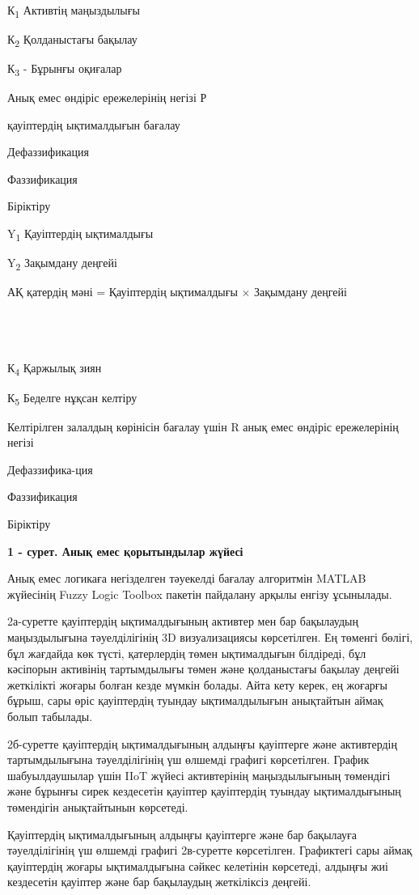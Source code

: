 \documentclass[
]{article}
\begin{document}
~

К\textsubscript{1} Активтің маңыздылығы

К\textsubscript{2} Қолданыстағы бақылау

К\textsubscript{3} - Бұрынғы оқиғалар

Анық емес өндіріс ережелерінің негізі Р

қауіптердің ықтималдығын бағалау

Дефаззификация

Фаззификация

Біріктіру

Y\textsubscript{1} Қауіптердің ықтималдығы

Y\textsubscript{2} Зақымдану деңгейі

АҚ қатердің мәні = Қауіптердің ықтималдығы × Зақымдану деңгейі

\textsubscript{~}

\textsubscript{~}

К\textsubscript{4} Қаржылық зиян

К\textsubscript{5} Беделге нұқсан келтіру

Келтірілген залалдың көрінісін бағалау үшін R анық емес өндіріс
ережелерінің негізі

Дефаззифика-ция

Фаззификация

Біріктіру

\textbf{1 - сурет. Анық емес қорытындылар жүйесі}

Анық емес логикаға негізделген тәуекелді бағалау алгоритмін MATLAB
жүйесінің Fuzzy Logic Toolbox пакетін пайдалану арқылы енгізу ұсынылады.

2а-суретте қауіптердің ықтималдығының активтер мен бар бақылаудың
маңыздылығына тәуелділігінің 3D визуализациясы көрсетілген. Ең төменгі
бөлігі, бұл жағдайда көк түсті, қатерлердің төмен ықтималдығын
білдіреді, бұл кәсіпорын активінің тартымдылығы төмен және қолданыстағы
бақылау деңгейі жеткілікті жоғары болған кезде мүмкін болады. Айта кету
керек, ең жоғарғы бұрыш, сары өріс қауіптердің туындау ықтималдылығын
анықтайтын аймақ болып табылады.

2б-суретте қауіптердің ықтималдығының алдыңғы қауіптерге және
активтердің тартымдылығына тәуелділігінің үш өлшемді графигі
көрсетілген. График шабуылдаушылар үшін IIoT жүйесі активтерінің
маңыздылығының төмендігі және бұрынғы сирек кездесетін қауіптер
қауіптердің туындау ықтималдығының төмендігін анықтайтынын көрсетеді.

Қауіптердің ықтималдығының алдыңғы қауіптерге және бар бақылауға
тәуелділігінің үш өлшемді графигі 2в-суретте көрсетілген. Графиктегі
сары аймақ қауіптердің жоғары ықтималдығына сәйкес келетінін көрсетеді,
алдыңғы жиі кездесетін қауіптер және бар бақылаудың жеткіліксіз деңгейі.
\end{document}
